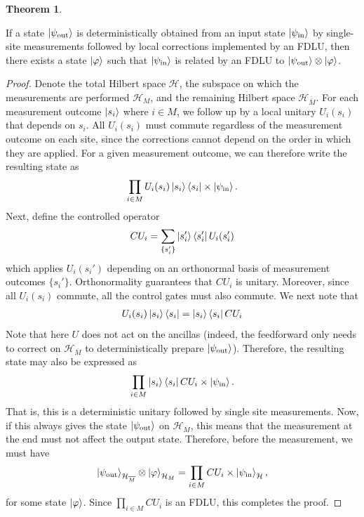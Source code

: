 \documentclass[nofootinbib,prx,twocolumn,showpacs,superscriptaddress,notitlepage,amsmath,amssymb]{revtex4-2}
\theoremstyle{definition}
\def\bra#1{\mathinner{\langle{#1}|}}
\def\ket#1{\mathinner{|{#1}\rangle}}
\newtheorem{theorem}{Theorem}
\begin{document}
\begin{theorem}
\label{thm:thm2}
\begin{shaded}
If a state $\ket{\psi_\textrm{out}}$ is deterministically obtained from an input state $\ket{\psi_\textrm{in}}$ by single-site measurements followed by local corrections implemented by an FDLU, then there exists a state $\ket{\varphi}$ such that $\ket{\psi_\textrm{in}}$ is related by an FDLU to $\ket{\psi_\textrm{out}} \otimes \ket{\varphi}$.
\end{shaded}

\begin{proof}
Denote the total Hilbert space $\mathcal H$, the subspace on which the measurements are performed $\mathcal H_M$, and the remaining Hilbert space $\mathcal H_{\overline{M}}$. For each measurement outcome $\ket{s_i}$ where $i\in M$, we follow up by a local unitary $U_i(s_i)$ that depends on $s_i$. All $U_i(s_i)$ must commute regardless of the measurement outcome on each site, since the corrections cannot depend on the order in which they are applied. For a given measurement outcome, we can therefore write the resulting state as
\begin{align}
  \prod_{i \in M}  U_i(s_i)  \ket{s_i}\bra{s_i} \times \ket{\psi_\textrm{in}}.
\end{align}
Next, define the controlled operator
\begin{align}
    CU_i = \sum_{\{s_i'\}} \ket{s_i'}\bra{s_i'}  U_i(s_i')
\end{align}
which applies $ U_i(s_i')$ depending on an orthonormal basis of measurement outcomes $\{s_i'\}$. Orthonormality guarantees that $CU_i$ is unitary. Moreover, since all $U_i(s_i)$ commute, all the control gates must also commute. We next note that
\begin{align}
    U_i(s_i)\ket{s_i}\bra{s_i} = \ket{s_i}\bra{s_i} CU_i 
\end{align}
Note that here $U$ does not act on the ancillas (indeed, the feedforward only needs to correct on $\mathcal H_{\overline{M}}$ to deterministically prepare $\ket{\psi_\textrm{out}}$).
Therefore, the resulting state may also be expressed as
\begin{align}
  \prod_{i \in M} \ket{s_i}\bra{s_i} CU_i  \times \ket{\psi_\textrm{in}}.
\end{align}
That is, this is a deterministic unitary followed by single site measurements. Now, if this always gives the state $\ket{\psi_\textrm{out}}$ on $\mathcal H_{\overline{M}}$, this means that the measurement at the end must not affect the output state. Therefore, before the measurement, we must have
\begin{align}
 \ket{\psi_\textrm{out}}_{\mathcal H_{\overline{M}}} \otimes \ket{\varphi}_{\mathcal H_M}  = \prod_{i \in M} CU_i  \times \ket{\psi_\textrm{in}}_{\mathcal H},
\end{align}
for some state $\ket{\varphi}$. Since $\prod_{i \in M} CU_i$ is an FDLU, this completes the proof.
\end{proof}
\end{theorem}
\end{document}
